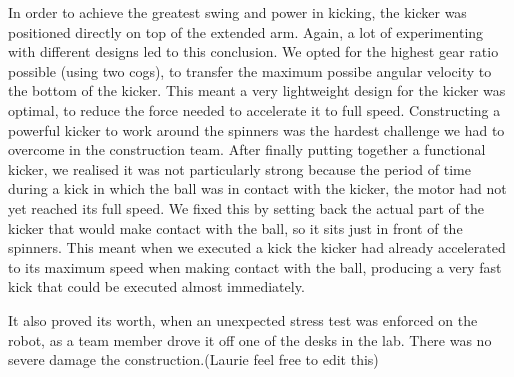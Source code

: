 In order to achieve the greatest swing and power in kicking, the kicker was positioned directly on top of the extended arm. Again, a lot of experimenting with different designs led to this conclusion. We opted for the highest gear ratio possible (using two cogs), to transfer the maximum possibe angular velocity to the bottom of the kicker. This meant a very lightweight design for the kicker was optimal, to reduce the force needed to accelerate it to full speed. Constructing a powerful kicker to work around the spinners was the hardest challenge we had to overcome in the construction team. After finally putting together a functional kicker, we realised it was not particularly strong because the period of time during a kick in which the ball was in contact with the kicker, the motor had not yet reached its full speed. We fixed this by setting back the actual part of the kicker that would make contact with the ball, so it sits just in front of the spinners. This meant when we executed a kick the kicker had already accelerated to its maximum speed when making contact with the ball, producing a very fast kick that could be executed almost immediately.

It also proved its worth, when an unexpected stress test was enforced on the robot, as a team member drove it off one of the desks in the lab. There was no severe damage the construction.(Laurie feel free to edit this) 

